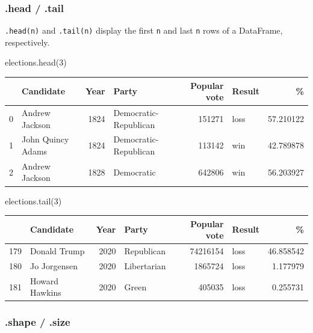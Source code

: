 \documentclass[
  letterpaper,
  DIV=11,
  numbers=noendperiod]{scrreprt}
\newenvironment{Shaded}{\begin{snugshade}}{\end{snugshade}}
\newcommand{\DecValTok}[1]{\textcolor[rgb]{0.68,0.00,0.00}{#1}}
\newcommand{\NormalTok}[1]{\textcolor[rgb]{0.00,0.23,0.31}{#1}}
\begin{document}
\hypertarget{head-.tail}{%
\subsubsection{.head / .tail}\label{head-.tail}}

\texttt{.head(n)} and \texttt{.tail(n)} display the first \texttt{n} and
last \texttt{n} rows of a DataFrame, respectively.

\begin{Shaded}
\begin{Highlighting}[]
\NormalTok{elections.head(}\DecValTok{3}\NormalTok{)}
\end{Highlighting}
\end{Shaded}

\begin{tabular}{llrlrlr}
\toprule
{} &          Candidate &  Year &                  Party &  Popular vote & Result &          \% \\
\midrule
0 &     Andrew Jackson &  1824 &  Democratic-Republican &        151271 &   loss &  57.210122 \\
1 &  John Quincy Adams &  1824 &  Democratic-Republican &        113142 &    win &  42.789878 \\
2 &     Andrew Jackson &  1828 &             Democratic &        642806 &    win &  56.203927 \\
\bottomrule
\end{tabular}

\begin{Shaded}
\begin{Highlighting}[]
\NormalTok{elections.tail(}\DecValTok{3}\NormalTok{)}
\end{Highlighting}
\end{Shaded}

\begin{tabular}{llrlrlr}
\toprule
{} &       Candidate &  Year &        Party &  Popular vote & Result &          \% \\
\midrule
179 &    Donald Trump &  2020 &   Republican &      74216154 &   loss &  46.858542 \\
180 &    Jo Jorgensen &  2020 &  Libertarian &       1865724 &   loss &   1.177979 \\
181 &  Howard Hawkins &  2020 &        Green &        405035 &   loss &   0.255731 \\
\bottomrule
\end{tabular}

\hypertarget{shape-.size}{%
\subsubsection{.shape / .size}\label{shape-.size}}
\end{document}
